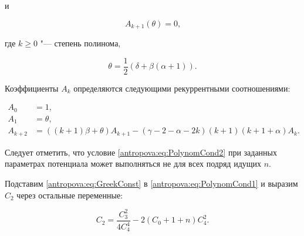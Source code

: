 и

\begin{equation}

\label{antropova:eq:PolynomCond2}

A_{k+1}(\theta) = 0\text{,}

\end{equation}

где $k\geq0$ "--- степень полинома,

\begin{equation}\label{antropova:eq:theta}

 \theta = \frac{1}{2}\left(\delta + \beta (\alpha + 1)\right) \text{.}

\end{equation}

Коэффициенты $A_k$ определяются следующими рекуррентными соотношениями:

\begin{equation}\label{antropova:eq:recurrence}

    \begin{aligned}

    A_0 &= 1\text{,}\\ A_1 &= \theta \text{,} \\

    A_{k + 2}&=\left((k+1)\beta+\theta\right)A_{k+1} - (\gamma - 2 - \alpha - 2k)(k+1)(k+1+\alpha)A_k\text{.}

    \end{aligned}

\end{equation}

Следует отметить, что условие \eqref{antropova:eq:PolynomCond2} при заданных параметрах потенциала может выполняться не для всех подряд идущих $n$.



\smallskip





Подставим \eqref{antropova:eq:GreekConst} в \eqref{antropova:eq:PolynomCond1} и выразим $C_2$ через остальные переменные:

\begin{equation}\label{antropova:eq:C2}

    C_2 = \frac{C_3^2}{4C_4^4} - 2(C_0 + 1 + n)C_4^2 \text{.}

\end{equation}



